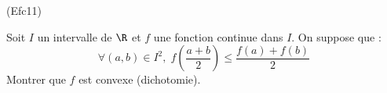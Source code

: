 \begin{tiny}(Efc11)\end{tiny} Soit $I$ un intervalle de $\R$ et $f$ une fonction continue dans $I$. On suppose que :
\begin{displaymath}
 \forall (a,b)\in I^2,\;
f(\frac{a+b}{2})\leq \frac{f(a)+f(b)}{2}
\end{displaymath}
Montrer que $f$ est convexe (dichotomie).